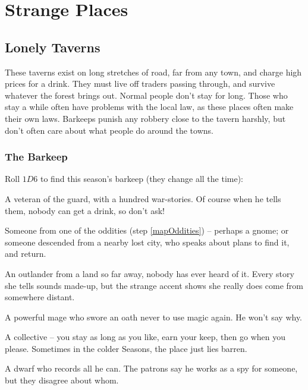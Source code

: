 \section{Strange Places}

\begin{multicols}{2}

\subsection{Lonely Taverns}
\label{lonelyTaverns}

These taverns exist on long stretches of road, far from any town, and
charge high prices for a drink. They must live off traders passing
through, and survive whatever the forest brings out. Normal people don't
stay for long. Those who stay a while often have problems with the local
law, as these places often make their own laws. Barkeeps punish any
robbery close to the tavern harshly, but don't often care about what
people do around the towns.

\subsubsection{The Barkeep}

Roll $1D6$ to find this season's barkeep (they change all the time):

\begin{dlist}
  \item
  A veteran of the \gls{guard}, with a hundred war-stories. Of course
  when he tells them, nobody can get a drink, so don't ask!
  \item
  Someone from one of the oddities (step \ref{mapOddities}) -- perhaps a gnome; or someone descended from a nearby lost city, who speaks about plans to find it, and return.
  \item
  An outlander from a land so far away, nobody has ever heard of it.
  Every story she tells sounds made-up, but the strange accent shows she really does come from somewhere distant.
  \item
  A powerful mage who swore an oath never to use magic again.
  He won't say why.
  \item
  A collective -- you stay as long as you like, earn your keep, then go
  when you please. Sometimes in the colder Seasons, the place just lies
  barren.
  \item
  A dwarf who records all he can.
  The patrons say he works as a spy for someone, but they disagree about whom.
\end{dlist}


\end{multicols}
